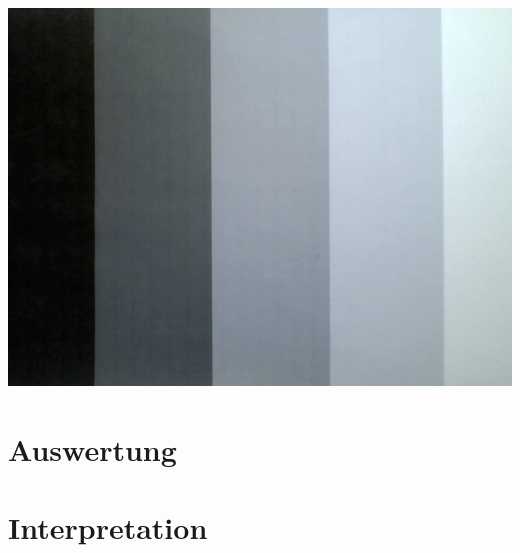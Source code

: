 \includegraphics[scale=0.5]{media/grauwertkeil.png}
\label{Fig:Grawertkeil}


\section{Auswertung}
\label{chap:VERSUCH_1_AUSWERTUNG}


\section{Interpretation}
\label{chap:VERSUCH_1_INTERPRETATION}